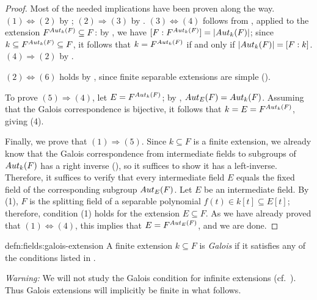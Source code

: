 \begin{proof}
  Most of the needed implications have been proven along the way.
  $(1) \iff (2)$ by ; $(2) \Rightarrow (3)$ by
  . $(3) \iff (4)$ follows from
  , applied to the extension
  $F^{Aut_k(F)} \subseteq F$: by , we have
  $[F : F^{Aut_k(F)}] = |Aut_k(F)|$; since
  $k \subseteq F^{Aut_k(F)} \subseteq F$, it follows that
  $k = F^{Aut_k(F)}$ if and only if $|Aut_k(F)| = [F : k]$.
  $(4) \Rightarrow (2)$ by .

  $(2) \iff (6)$ holds by
  , since
  finite separable extensions are simple ().

  To prove $(5) \Rightarrow (4)$, let $E = F^{Aut_k(F)}$; by
  , $Aut_E(F) = Aut_k(F)$.  Assuming that the
  Galois correspondence is bijective, it follows that
  $k = E = F^{Aut_k(F)}$, giving (4).

  Finally, we prove that $(1) \Rightarrow (5)$. Since $k \subseteq F$
  is a finite extension, we already know that the Galois
  correspondence from intermediate fields to subgroups of $Aut_k(F)$
  has a right inverse (), so it suffices to show
  it has a left-inverse. Therefore, it suffices to verify that every
  intermediate field $E$ equals the fixed field of the corresponding
  subgroup $Aut_E(F)$. Let $E$ be an intermediate field. By (1), $F$
  is the splitting field of a separable polynomial
  $f(t) \in k[t] \subseteq E[t]$; therefore, condition (1) holds for
  the extension $E \subseteq F$.  As we have already proved that
  $(1) \iff (4)$, this implies that $E = F^{Aut_E(F)}$, and we are
  done.
\end{proof}
\begin{defn}{}{defn:fields:galois-extension}
  A finite extension $k \subseteq F$ is \emph{Galois} if it satisfies
  any of the conditions listed in .
\end{defn}
\emph{Warning:} We will not study the Galois condition for infinite
extensions (cf.\ ). Thus Galois extensions will
implicitly be finite in what follows.

